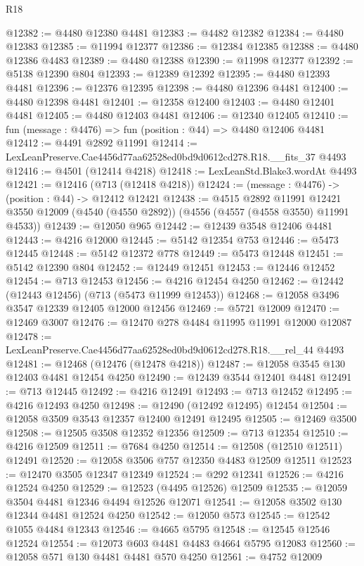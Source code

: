 \begin{lexlean}{R18}
\begin{coremodule}
@12382 := @4480 @12380 @4481
@12383 := @4482 @12382
@12384 := @4480 @12383
@12385 := @11994 @12377
@12386 := @12384 @12385
@12388 := @4480 @12386 @4483
@12389 := @4480 @12388
@12390 := @11998 @12377
@12392 := @5138 @12390 @804
@12393 := @12389 @12392
@12395 := @4480 @12393 @4481
@12396 := @12376 @12395
@12398 := @4480 @12396 @4481
@12400 := @4480 @12398 @4481
@12401 := @12358 @12400
@12403 := @4480 @12401 @4481
@12405 := @4480 @12403 @4481
@12406 := @12340 @12405
@12410 := fun (message : @4476) => fun (position : @44) => @4480 @12406 @4481
@12412 := @4491 @2892 @11991
@12414 := LexLeanPreserve.Cae4456d77aa62528ed0bd9d0612cd278.R18.__fits_37 @4493
@12416 := @4501 (@12414 @4218)
@12418 := LexLeanStd.Blake3.wordAt @4493
@12421 := @12416 (@713 (@12418 @4218))
@12424 := (message : @4476) -> (position : @44) -> @12412 @12421
@12438 := @4515
    @2892
    @11991
    @12421
    @3550
    @12009
    (@4540 (@4550 @2892))
    (@4556 (@4557 (@4558 @3550) @11991 @4533))
@12439 := @12050 @965
@12442 := @12439 @3548 @12406 @4481
@12443 := @4216 @12000
@12445 := @5142 @12354 @753
@12446 := @5473 @12445
@12448 := @5142 @12372 @778
@12449 := @5473 @12448
@12451 := @5142 @12390 @804
@12452 := @12449 @12451
@12453 := @12446 @12452
@12454 := @713 @12453
@12456 := @4216 @12454 @4250
@12462 := @12442 (@12443 @12456) (@713 (@5473 @11999 @12453))
@12468 := @12058 @3496 @3547 @12339 @12405 @12000 @12456
@12469 := @5721 @12009
@12470 := @12469 @3007
@12476 := @12470 @278 @4484 @11995 @11991 @12000 @12087
@12478 := LexLeanPreserve.Cae4456d77aa62528ed0bd9d0612cd278.R18.__rel_44 @4493
@12481 := @12468 (@12476 (@12478 @4218))
@12487 := @12058 @3545 @130 @12403 @4481 @12454 @4250
@12490 := @12439 @3544 @12401 @4481
@12491 := @713 @12445
@12492 := @4216 @12491
@12493 := @713 @12452
@12495 := @4216 @12493 @4250
@12498 := @12490 (@12492 @12495) @12454
@12504 := @12058 @3509 @3543 @12357 @12400 @12491 @12495
@12505 := @12469 @3500
@12508 := @12505 @3508 @12352 @12356
@12509 := @713 @12354
@12510 := @4216 @12509
@12511 := @7684 @4250
@12514 := @12508 (@12510 @12511) @12491
@12520 := @12058 @3506 @757 @12350 @4483 @12509 @12511
@12523 := @12470 @3505 @12347 @12349
@12524 := @292 @12341
@12526 := @4216 @12524 @4250
@12529 := @12523 (@4495 @12526) @12509
@12535 := @12059 @3504 @4481 @12346 @4494 @12526 @12071
@12541 := @12058 @3502 @130 @12344 @4481 @12524 @4250
@12542 := @12050 @573
@12545 := @12542 @1055 @4484 @12343
@12546 := @4665 @5795
@12548 := @12545 @12546 @12524
@12554 := @12073 @603 @4481 @4483 @4664 @5795 @12083
@12560 := @12058 @571 @130 @4481 @4481 @570 @4250
@12561 := @4752 @12009

\end{coremodule}
\end{lexlean}
